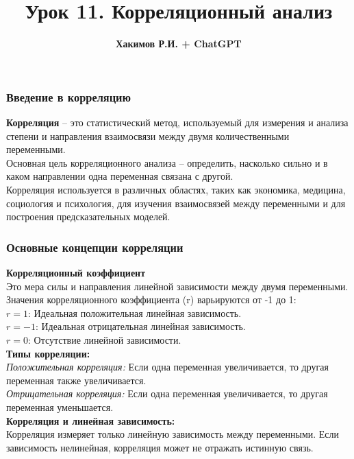 \documentclass[aspectratio=169]{beamer}
\title{\bf Урок 11. Корреляционный анализ}
\author{{\bf Хакимов Р.И. + ChatGPT}}
\date[\today]{}
\begin{document}
\begin{frame}
\titlepage
\end{frame}

\begin{frame}
\frametitle{Введение в корреляцию}
{\bf Корреляция} -- это статистический метод, используемый для измерения и анализа степени и направления взаимосвязи между двумя количественными переменными.
\newline\\
Основная цель корреляционного анализа -- определить, насколько сильно и в каком направлении одна переменная связана с другой.
\newline\\
Корреляция используется в различных областях, таких как экономика, медицина, социология и психология, для изучения взаимосвязей между переменными и для построения предсказательных моделей.
\end{frame}

\begin{frame}
\frametitle{Основные концепции корреляции}
{\bf Корреляционный коэффициент}\\
Это мера силы и направления линейной зависимости между двумя переменными.\\
Значения корреляционного коэффициента (r) варьируются от -1 до 1:\\
\quad\( r = 1 \): Идеальная положительная линейная зависимость.\\
\quad\( r = -1 \): Идеальная отрицательная линейная зависимость.\\
\quad\( r = 0 \): Отсутствие линейной зависимости.\\
{\bf Типы корреляции:}\\
{\it Положительная корреляция:} Если одна переменная увеличивается, то другая переменная также увеличивается.\\
{\it Отрицательная корреляция:} Если одна переменная увеличивается, то другая переменная уменьшается.\\
{\bf Корреляция и линейная зависимость:}\\
Корреляция измеряет только линейную зависимость между переменными. Если зависимость нелинейная, корреляция может не отражать истинную связь.
\end{frame}
\end{document}
